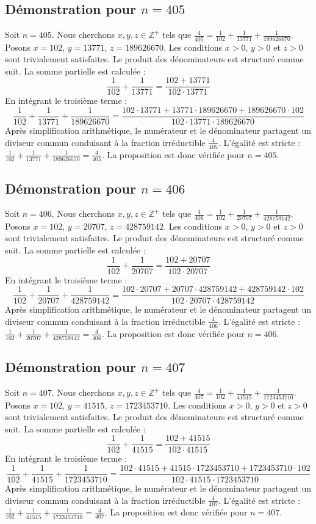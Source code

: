 \documentclass[11pt,a4paper]{article}
\begin{document}
\subsection{Démonstration pour $n = 405$}
Soit $n = 405$. Nous cherchons $x, y, z \in \mathbb{Z}^{+}$ tels que $\frac{4}{405} = \frac{1}{102} + \frac{1}{13771} + \frac{1}{189626670}$.
Posons $x = 102$, $y = 13771$, $z = 189626670$.
Les conditions $x > 0$, $y > 0$ et $z > 0$ sont trivialement satisfaites.
Le produit des dénominateurs est structuré comme suit. La somme partielle est calculée :
$$ \frac{1}{102} + \frac{1}{13771} = \frac{102+13771}{102 \cdot 13771} $$
En intégrant le troisième terme :
$$ \frac{1}{102} + \frac{1}{13771} + \frac{1}{189626670} = \frac{102 \cdot 13771 + 13771 \cdot 189626670 + 189626670 \cdot 102}{102 \cdot 13771 \cdot 189626670} $$
Après simplification arithmétique, le numérateur et le dénominateur partagent un diviseur commun conduisant à la fraction irréductible $\frac{4}{405}$.
L'égalité est stricte : $\frac{1}{102} + \frac{1}{13771} + \frac{1}{189626670} = \frac{4}{405}$.
La proposition est donc vérifiée pour $n = 405$.
\subsection{Démonstration pour $n = 406$}
Soit $n = 406$. Nous cherchons $x, y, z \in \mathbb{Z}^{+}$ tels que $\frac{4}{406} = \frac{1}{102} + \frac{1}{20707} + \frac{1}{428759142}$.
Posons $x = 102$, $y = 20707$, $z = 428759142$.
Les conditions $x > 0$, $y > 0$ et $z > 0$ sont trivialement satisfaites.
Le produit des dénominateurs est structuré comme suit. La somme partielle est calculée :
$$ \frac{1}{102} + \frac{1}{20707} = \frac{102+20707}{102 \cdot 20707} $$
En intégrant le troisième terme :
$$ \frac{1}{102} + \frac{1}{20707} + \frac{1}{428759142} = \frac{102 \cdot 20707 + 20707 \cdot 428759142 + 428759142 \cdot 102}{102 \cdot 20707 \cdot 428759142} $$
Après simplification arithmétique, le numérateur et le dénominateur partagent un diviseur commun conduisant à la fraction irréductible $\frac{4}{406}$.
L'égalité est stricte : $\frac{1}{102} + \frac{1}{20707} + \frac{1}{428759142} = \frac{4}{406}$.
La proposition est donc vérifiée pour $n = 406$.
\subsection{Démonstration pour $n = 407$}
Soit $n = 407$. Nous cherchons $x, y, z \in \mathbb{Z}^{+}$ tels que $\frac{4}{407} = \frac{1}{102} + \frac{1}{41515} + \frac{1}{1723453710}$.
Posons $x = 102$, $y = 41515$, $z = 1723453710$.
Les conditions $x > 0$, $y > 0$ et $z > 0$ sont trivialement satisfaites.
Le produit des dénominateurs est structuré comme suit. La somme partielle est calculée :
$$ \frac{1}{102} + \frac{1}{41515} = \frac{102+41515}{102 \cdot 41515} $$
En intégrant le troisième terme :
$$ \frac{1}{102} + \frac{1}{41515} + \frac{1}{1723453710} = \frac{102 \cdot 41515 + 41515 \cdot 1723453710 + 1723453710 \cdot 102}{102 \cdot 41515 \cdot 1723453710} $$
Après simplification arithmétique, le numérateur et le dénominateur partagent un diviseur commun conduisant à la fraction irréductible $\frac{4}{407}$.
L'égalité est stricte : $\frac{1}{102} + \frac{1}{41515} + \frac{1}{1723453710} = \frac{4}{407}$.
La proposition est donc vérifiée pour $n = 407$.
\end{document}
